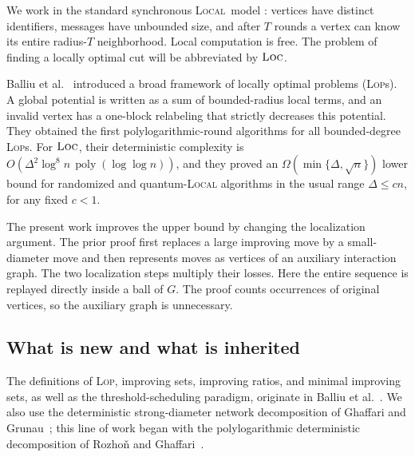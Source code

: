\documentclass[11pt]{article}
\theoremstyle{definition}
\theoremstyle{remark}
\newcommand{\poly}{\operatorname{poly}}
\newcommand{\LOC}{\textnormal{\textsc{Loc}}}
\newcommand{\LOP}{\textnormal{\textsc{Lop}}}
\newcommand{\LOCAL}{\textnormal{\textsc{Local}}}
\begin{document}
We work in the standard synchronous \LOCAL\ model
\cite{Linial1992,NaorStockmeyer1995}: vertices have distinct identifiers, messages
have unbounded size, and after $T$ rounds a vertex can know its entire radius-$T$
neighborhood.  Local computation is free.  The problem of finding a locally optimal
cut will be abbreviated by $\LOC$.

Balliu et al.~\cite{BalliuEtAl2026} introduced a broad framework of locally optimal
problems (\LOP s).  A global potential is written as a sum of bounded-radius local
terms, and an invalid vertex has a one-block relabeling that strictly decreases this
potential.  They obtained the first polylogarithmic-round algorithms for all
bounded-degree \LOP s.  For $\LOC$, their deterministic complexity is
$O(\Delta^2\log^8 n\,\poly(\log\log n))$, and they proved an
$\Omega(\min\{\Delta,\sqrt n\})$ lower bound for randomized and quantum-\LOCAL
algorithms in the usual range $\Delta\leq cn$, for any fixed $c<1$.

The present work improves the upper bound by changing the localization argument.
The prior proof first replaces a large improving move by a small-diameter move and
then represents moves as vertices of an auxiliary interaction graph.  The two
localization steps multiply their losses.  Here the entire sequence is replayed
directly inside a ball of $G$.  The proof counts occurrences of original vertices,
so the auxiliary graph is unnecessary.

\subsection{What is new and what is inherited}

The definitions of \LOP, improving sets, improving ratios, and minimal improving
sets, as well as the threshold-scheduling paradigm, originate in
Balliu et al.~\cite{BalliuEtAl2026}.  We also use the deterministic strong-diameter
network decomposition of Ghaffari and Grunau~\cite{GhaffariGrunau2024}; this line of
work began with the polylogarithmic deterministic decomposition of Rozho\v{n} and
Ghaffari~\cite{RozhonGhaffari2020}.
\end{document}
